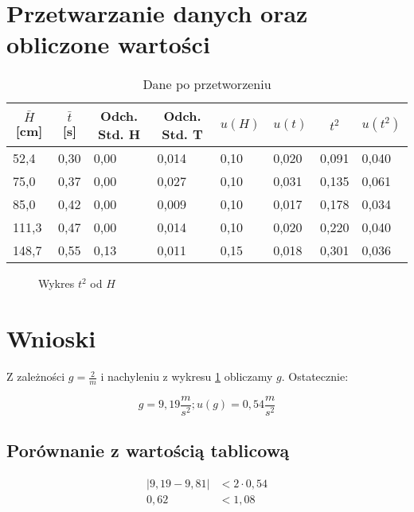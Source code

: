\documentclass[a4paper,12pt]{article}
\begin{document}
\section{Przetwarzanie danych oraz obliczone wartości}

\begin{table}[h]
\centering
\begin{tabular}{|l|l|l|l|l|l|l|l|}
\hline
\multicolumn{1}{|c|}{$\bar{H}$ [cm]} &
  \multicolumn{1}{c|}{$\bar{t}$ [s]} &
  \multicolumn{1}{c|}{Odch. Std. H} &
  \multicolumn{1}{c|}{Odch. Std. T} &
  \multicolumn{1}{c|}{$u(H)$} &
  \multicolumn{1}{c|}{$u(t)$} &
  \multicolumn{1}{c|}{$t^2$} &
  \multicolumn{1}{c|}{$u(t^2)$} \\ \hline\hline
52,4  & 0,30 & 0,00 & 0,014 & 0,10 & 0,020 & 0,091 & 0,040 \\ \hline
75,0  & 0,37 & 0,00 & 0,027 & 0,10 & 0,031 & 0,135 & 0,061 \\ \hline
85,0  & 0,42 & 0,00 & 0,009 & 0,10 & 0,017 & 0,178 & 0,034 \\ \hline
111,3 & 0,47 & 0,00 & 0,014 & 0,10 & 0,020 & 0,220 & 0,040 \\ \hline
148,7 & 0,55 & 0,13 & 0,011 & 0,15 & 0,018 & 0,301 & 0,036 \\ \hline
\end{tabular}
\caption{Dane po przetworzeniu}
\label{tab:proc}
\end{table}

\begin{figure}
	
	\centering
	\caption{Wykres $t^2$ od $H$}
	\label{wyk}
\end{figure}

\section{Wnioski}

Z zależności $g = \frac{2}{m}$ i nachyleniu z wykresu \ref{wyk} obliczamy $g$. Ostatecznie:

\[g = 9,19 \frac{m}{s^2}; u\left(g\right) = 0,54 \frac{m}{s^2}\]

\subsection*{Porównanie z wartością tablicową}

\begin{align*}
	\left|9,19 - 9,81\right| &< 2 \cdot 0,54\\
	0,62 &< 1,08
\end{align*}
\end{document}
